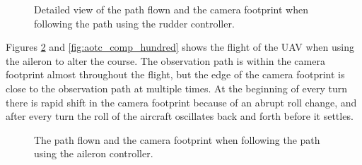 \begin{figure}[]
    \centering
    \caption{Detailed view of the path flown and the camera footprint when following the path using the rudder controller.}
	\label{fig:ratc_comp_hundred}
\end{figure}

Figures \ref{fig:aotc_path_hundred} and \ref{fig:aotc_comp_hundred} shows the flight of the UAV when using the aileron to alter the course. The observation path is within the camera footprint almost throughout the flight, but the edge of the camera footprint is close to the observation path at multiple times. At the beginning of every turn there is rapid shift in the camera footprint because of an abrupt roll change, and after every turn the roll of the aircraft oscillates back and forth before it settles.

\begin{figure}[]
    \centering
    \caption{The path flown and the camera footprint when following the path using the aileron controller.}
	\label{fig:aotc_path_hundred}
\end{figure}

